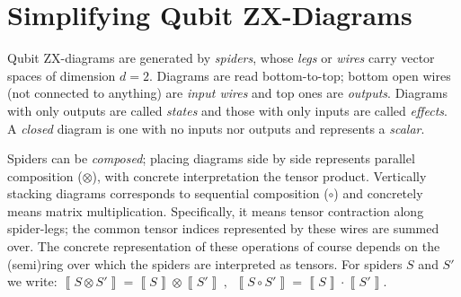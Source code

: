 \section{Simplifying Qubit ZX-Diagrams}



Qubit ZX-diagrams are generated by \emph{spiders}, whose \emph{legs}
or \emph{wires} carry vector spaces of dimension $d=2$.
Diagrams are read bottom-to-top; bottom open wires (not connected to anything) are \emph{input wires} and top ones are \emph{outputs}.
Diagrams with only outputs are called \emph{states} and those with only inputs are called \emph{effects}.
A \emph{closed} diagram is one with no inputs nor outputs and represents a \emph{scalar}.

Spiders can be \emph{composed};
placing diagrams side by side represents parallel composition ($\otimes$),
with concrete interpretation the tensor product.
Vertically stacking diagrams corresponds to sequential composition ($\circ$) and concretely means matrix multiplication.
Specifically, it means tensor contraction along spider-legs; the common tensor indices represented by these wires are summed over.
The concrete representation of these operations of course depends on the (semi)ring over which the spiders are interpreted as tensors.
For spiders $S$ and $S'$ we write:
$\left\llbracket S \otimes S' \right\rrbracket = \left\llbracket S \right\rrbracket \otimes \left\llbracket S' \right\rrbracket ~, ~~
	\left\llbracket S \circ S' \right\rrbracket = \left\llbracket S \right\rrbracket \cdot \left\llbracket S' \right\rrbracket $.


